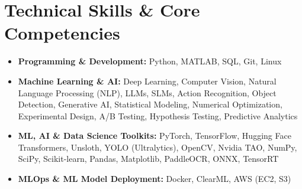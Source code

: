\documentclass[a4paper,11pt]{article}
\begin{document}
\section{Technical Skills \& Core Competencies}
	\begin{itemize}[leftmargin=*, itemsep = -2pt]
    \item{\textbf{Programming \& Development:} Python, MATLAB, SQL, Git, Linux}
    \item{\textbf{Machine Learning \& AI:} Deep Learning, Computer Vision, Natural Language Processing (NLP), LLMs, SLMs, Action Recognition, Object Detection, Generative AI, Statistical Modeling, Numerical Optimization, Experimental Design, A/B Testing, Hypothesis Testing, Predictive Analytics} 
		\item{\textbf{ML, AI \& Data Science Toolkits:} PyTorch, TensorFlow, Hugging Face Transformers, Unsloth, YOLO (Ultralytics), OpenCV, Nvidia TAO, NumPy, SciPy, Scikit-learn, Pandas, Matplotlib, PaddleOCR, ONNX, TensorRT}
		\item{\textbf{MLOps \& ML Model Deployment:} Docker, ClearML, AWS (EC2, S3)}
    
	\end{itemize}
\end{document}
